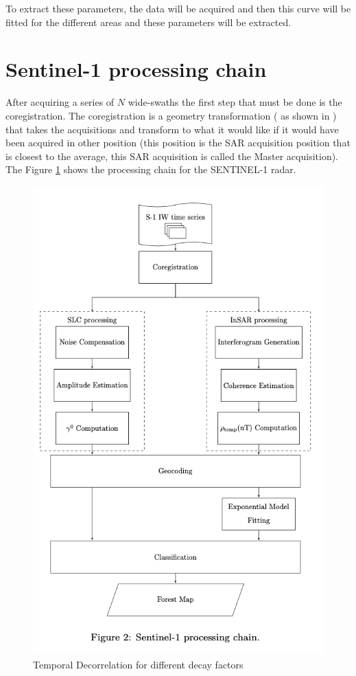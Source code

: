To extract these parameters, the data will be acquired and then this curve will be fitted for the different areas and these parameters will be extracted.

\section{Sentinel-1 processing chain}
\label{tresponto2}
After acquiring a series of $N$ wide-swaths the first step that must be done is the coregistration. The coregistration is a geometry transformation ( as shown in \cite{coregistration}) that takes the acquisitions and transform to what it would like if it would have been acquired in other position (this position is the SAR acquisition position that is closest to the average, this SAR acquisition is called the Master acquisition). The Figure \ref{fig:processing_chain} shows the processing chain for the SENTINEL-1 radar.

\begin{figure}[H]
    \centering
    \includegraphics[width=0.7\linewidth]{Cap3/chain.png}
    \caption{Temporal Decorrelation for different decay factors \cite{Paolo}}
    \label{fig:processing_chain}
\end{figure}

